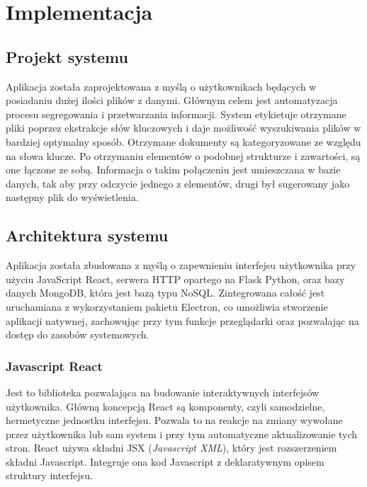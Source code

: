 \documentclass[12pt,a4paper,twoside]{article}
\begin{document}
\section{Implementacja}
\subsection{Projekt systemu}
Aplikacja została zaprojektowana z myślą o użytkownikach będących w posiadaniu dużej ilości plików z danymi. Głównym celem jest automatyzacja procesu segregowania i przetwarzania informacji. System etykietuje otrzymane pliki poprzez ekstrakcje słów kluczowych i daje możliwość wyszukiwania plików w bardziej optymalny sposób. Otrzymane dokumenty są kategoryzowane ze względu na słowa klucze. Po otrzymaniu elementów o podobnej strukturze i zawartości, są one łączone ze sobą. Informacja o takim połączeniu jest umieszczana w bazie danych, tak aby przy odczycie jednego z elementów, drugi był sugerowany jako następny plik do wyświetlenia. \par
\subsection{Architektura systemu} %
Aplikacja została zbudowana z myślą o zapewnieniu interfejsu użytkownika przy użyciu JavaScript React, serwera HTTP opartego na Flask Python, oraz bazy danych MongoDB, która jest bazą typu NoSQL. Zintegrowana całość jest uruchamiana z wykorzystaniem pakietu Electron, co umożliwia stworzenie aplikacji natywnej, zachowując przy tym funkcje przeglądarki oraz pozwalając na dostęp do zasobów systemowych.
\subsubsection{Javascript React}
Jest to biblioteka pozwalająca na budowanie interaktywnych interfejsów użytkownika. Główną koncepcją React są komponenty, czyli samodzielne, hermetyczne jednostku interfejsu. Pozwala to na reakcje na zmiany wywołane przez użytkownika lub sam system i przy tym automatyczne aktualizowanie tych stron. React używa składni JSX (\textit{Javascript XML}), który jest rozszerzeniem składni Javascript. Integruje ona kod Javascript z deklaratywnym opisem struktury interfejsu.
\end{document}
